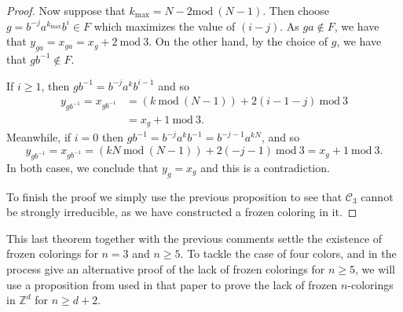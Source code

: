 \documentclass[letterpaper,11pt,reqno]{amsart}
\theoremstyle{plain}
\theoremstyle{definition}
\theoremstyle{cupremark}
\begin{document}
\begin{proof}
	Now suppose that $k_{\mathrm{max}}=N-2\mathrm{mod}\ (N-1)$. Then choose $g=b^{-j}a^{k_{\mathrm{max}}}b^i\in F$ which maximizes the value of $(i-j)$. As $ga\notin F$, we have that $y_{ga}=x_{ga}=x_g+2\ \mathrm{mod}\ 3$. On the other hand, by the choice of $g$, we have that $gb^{-1}\notin F$.
	
	If $i\ge 1$, then $gb^{-1}=b^{-j}a^kb^{i-1}$ and so
	\begin{align*}
	y_{gb^{-1}}=x_{gb^{-1}}&=(k\ \mathrm{mod}\ (N-1))+2(i-1-j)\ \mathrm{mod}\ 3\\
	&=x_g+1\ \mathrm{mod}\ 3.
	\end{align*}
	Meanwhile, if $i=0$ then $gb^{-1}=b^{-j}a^kb^{-1}=b^{-j-1}a^{kN}$, and so
	$$
	y_{gb^{-1}}=x_{gb^{-1}}=(kN \ \mathrm{mod}\ (N-1))+2(-j-1)\ \mathrm{mod}\ 3=x_{g}+1\ \mathrm{mod}\ 3.
	$$
	In both cases, we conclude that $y_g=x_g$ and this is a contradiction.
	
	
	To finish the proof we simply use the previous proposition to see that $\mathcal{C}_3$ cannot be strongly irreducible, as we have constructed a frozen coloring in it.
\end{proof}

This last theorem together with the previous comments settle the existence of frozen colorings for $n=3$ and $n\ge 5$. To tackle the case of four colors, and in the process give an alternative proof of the lack of frozen colorings for $n\ge 5$, we will use a proposition from \cite{alon2019mixing} used in that paper to prove the lack of frozen $n$-colorings in $\mathbb{Z}^d$ for $n\ge d+2$.
\end{document}
